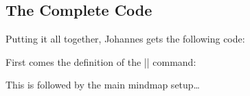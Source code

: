 \subsection{The Complete Code}

Putting it all together, Johannes gets the following code:

First comes the definition of the |\lecture| command:

\begin{codeexample}
\def\lecture#1#2#3#4#5#6{
  \node [annotation, #3, scale=0.65, text width=4cm, inner sep=2mm, fill=white] at (#4) {
    Lecture #1: \textcolor{orange}{\textbf{#2}}
    \list{--}{\topsep=2pt\itemsep=0pt\parsep=0pt
              \parskip=0pt\labelwidth=8pt\leftmargin=8pt
              \itemindent=0pt\labelsep=2pt}
    #5
    \endlist
  };
  \node [anchor=base west] at (cal-#6.base east) {\textcolor{orange}{\textbf{#2}}};
}  
\end{codeexample}

This is followed by the main mindmap setup\dots

